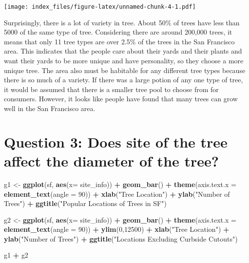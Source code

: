 \documentclass[
]{article}
\newenvironment{Shaded}{\begin{snugshade}}{\end{snugshade}}
\newcommand{\DataTypeTok}[1]{\textcolor[rgb]{0.13,0.29,0.53}{#1}}
\newcommand{\DecValTok}[1]{\textcolor[rgb]{0.00,0.00,0.81}{#1}}
\newcommand{\KeywordTok}[1]{\textcolor[rgb]{0.13,0.29,0.53}{\textbf{#1}}}
\newcommand{\NormalTok}[1]{#1}
\newcommand{\OperatorTok}[1]{\textcolor[rgb]{0.81,0.36,0.00}{\textbf{#1}}}
\newcommand{\StringTok}[1]{\textcolor[rgb]{0.31,0.60,0.02}{#1}}
\begin{document}
\texttt{[image: index\_files/figure-latex/unnamed-chunk-4-1.pdf]}

Surprisingly, there is a lot of variety in tree. About 50\% of trees
have less than 5000 of the same type of tree. Considering there are
around 200,000 trees, it means that only 11 tree types are over 2.5\% of
the trees in the San Francisco area. This indicates that the people care
about their yards and their plants and want their yards to be more
unique and have personality, so they choose a more unique tree. The area
also must be habitable for any different tree types because there is so
much of a variety. If there was a large potion of any one type of tree,
it would be assumed that there is a smaller tree pool to choose from for
consumers. However, it looks like people have found that many trees can
grow well in the San Francisco area.

\hypertarget{question-3-does-site-of-the-tree-affect-the-diameter-of-the-tree}{%
\section{Question 3: Does site of the tree affect the diameter of the
tree?}\label{question-3-does-site-of-the-tree-affect-the-diameter-of-the-tree}}

\begin{Shaded}
\begin{Highlighting}[]
\NormalTok{g1 <-}\StringTok{ }\KeywordTok{ggplot}\NormalTok{(sf, }\KeywordTok{aes}\NormalTok{(}\DataTypeTok{x=}\NormalTok{ site_info)) }\OperatorTok{+}
\StringTok{  }\KeywordTok{geom_bar}\NormalTok{() }\OperatorTok{+}
\StringTok{  }\KeywordTok{theme}\NormalTok{(}\DataTypeTok{axis.text.x =} \KeywordTok{element_text}\NormalTok{(}\DataTypeTok{angle =} \DecValTok{90}\NormalTok{)) }\OperatorTok{+}
\StringTok{  }\KeywordTok{xlab}\NormalTok{(}\StringTok{"Tree Location"}\NormalTok{) }\OperatorTok{+}
\StringTok{  }\KeywordTok{ylab}\NormalTok{(}\StringTok{"Number of Trees"}\NormalTok{) }\OperatorTok{+}
\StringTok{  }\KeywordTok{ggtitle}\NormalTok{(}\StringTok{"Popular Locations of Trees in SF"}\NormalTok{)}

\NormalTok{g2 <-}\StringTok{ }\KeywordTok{ggplot}\NormalTok{(sf, }\KeywordTok{aes}\NormalTok{(}\DataTypeTok{x=}\NormalTok{ site_info)) }\OperatorTok{+}
\StringTok{  }\KeywordTok{geom_bar}\NormalTok{() }\OperatorTok{+}
\StringTok{  }\KeywordTok{theme}\NormalTok{(}\DataTypeTok{axis.text.x =} \KeywordTok{element_text}\NormalTok{(}\DataTypeTok{angle =} \DecValTok{90}\NormalTok{)) }\OperatorTok{+}\StringTok{ }
\StringTok{  }\KeywordTok{ylim}\NormalTok{(}\DecValTok{0}\NormalTok{,}\DecValTok{12500}\NormalTok{) }\OperatorTok{+}
\StringTok{  }\KeywordTok{xlab}\NormalTok{(}\StringTok{"Tree Location"}\NormalTok{) }\OperatorTok{+}
\StringTok{  }\KeywordTok{ylab}\NormalTok{(}\StringTok{"Number of Trees"}\NormalTok{) }\OperatorTok{+}
\StringTok{  }\KeywordTok{ggtitle}\NormalTok{(}\StringTok{"Locations Excluding Curbside Cutouts"}\NormalTok{)}

\NormalTok{g1 }\OperatorTok{+}\StringTok{ }\NormalTok{g2}
\end{Highlighting}
\end{Shaded}
\end{document}
